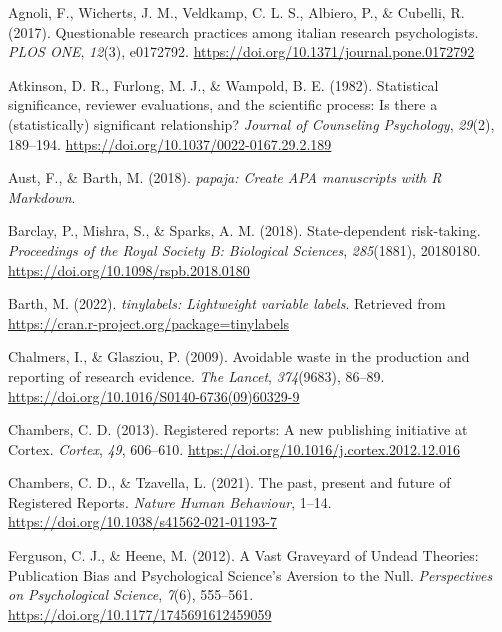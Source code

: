 \documentclass[
  ,man,mask,floatsintext]{apa6}
\newlength{\cslhangindent}
\newlength{\cslentryspacingunit} %
\newenvironment{CSLReferences}[2] %
 {%
  \setlength{\parindent}{0pt}
  \ifodd #1
  \let\oldpar\par
  \def\par{\hangindent=\cslhangindent\oldpar}
  \fi
  \setlength{\parskip}{#2\cslentryspacingunit}
 }%
 {}
\begin{document}
\hypertarget{refs}{}
\begin{CSLReferences}{1}{0}
\leavevmode{}%
Agnoli, F., Wicherts, J. M., Veldkamp, C. L. S., Albiero, P., \& Cubelli, R. (2017). Questionable research practices among italian research psychologists. \emph{PLOS ONE}, \emph{12}(3), e0172792. \url{https://doi.org/10.1371/journal.pone.0172792}

\leavevmode{}%
Atkinson, D. R., Furlong, M. J., \& Wampold, B. E. (1982). Statistical significance, reviewer evaluations, and the scientific process: {Is} there a (statistically) significant relationship? \emph{Journal of Counseling Psychology}, \emph{29}(2), 189--194. \url{https://doi.org/10.1037/0022-0167.29.2.189}

\leavevmode{}%
Aust, F., \& Barth, M. (2018). \emph{{papaja}: {Create APA} manuscripts with {R Markdown}}.

\leavevmode{}%
Barclay, P., Mishra, S., \& Sparks, A. M. (2018). State-dependent risk-taking. \emph{Proceedings of the Royal Society B: Biological Sciences}, \emph{285}(1881), 20180180. \url{https://doi.org/10.1098/rspb.2018.0180}

\leavevmode{}%
Barth, M. (2022). \emph{{tinylabels}: Lightweight variable labels}. Retrieved from \url{https://cran.r-project.org/package=tinylabels}

\leavevmode{}%
Chalmers, I., \& Glasziou, P. (2009). Avoidable waste in the production and reporting of research evidence. \emph{The Lancet}, \emph{374}(9683), 86--89. \url{https://doi.org/10.1016/S0140-6736(09)60329-9}

\leavevmode{}%
Chambers, C. D. (2013). Registered reports: {A} new publishing initiative at {Cortex}. \emph{Cortex}, \emph{49}, 606--610. \url{https://doi.org/10.1016/j.cortex.2012.12.016}

\leavevmode{}%
Chambers, C. D., \& Tzavella, L. (2021). The past, present and future of {Registered Reports}. \emph{Nature Human Behaviour}, 1--14. \url{https://doi.org/10.1038/s41562-021-01193-7}

\leavevmode{}%
Ferguson, C. J., \& Heene, M. (2012). A {Vast Graveyard} of {Undead Theories}: {Publication Bias} and {Psychological Science}'s {Aversion} to the {Null}. \emph{Perspectives on Psychological Science}, \emph{7}(6), 555--561. \url{https://doi.org/10.1177/1745691612459059}


\end{CSLReferences}
\end{document}
